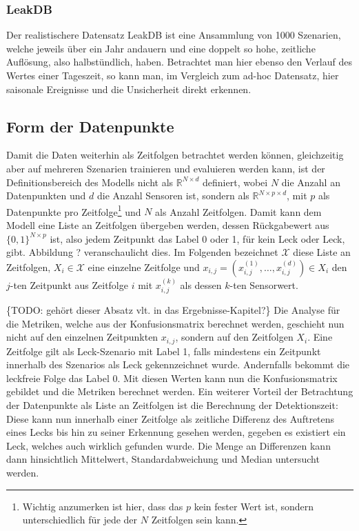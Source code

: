 \subsubsection*{LeakDB}

Der realistischere Datensatz LeakDB ist eine Ansammlung von 1000 Szenarien, welche jeweils über ein Jahr andauern
 und eine doppelt so hohe, zeitliche Auflösung, also halbstündlich, haben. Betrachtet man hier ebenso den Verlauf
 des Wertes einer Tageszeit, so kann man, im Vergleich zum ad-hoc Datensatz, hier saisonale Ereignisse und die
 Unsicherheit direkt erkennen.

\subsection*{Form der Datenpunkte}

Damit die Daten weiterhin als Zeitfolgen betrachtet werden können, gleichzeitig aber auf mehreren Szenarien
 trainieren und evaluieren werden kann, ist der Definitionsbereich des Modells nicht als $\mathbb{R}^{N \times d}$
 definiert, wobei $N$ die Anzahl an Datenpunkten und $d$ die Anzahl Sensoren ist, sondern als
 $\mathbb{R}^{N \times p \times d}$, mit $p$ als Datenpunkte pro Zeitfolge\footnote{Wichtig anzumerken ist hier,
 dass das $p$ kein fester Wert ist, sondern unterschiedlich für jede der $N$ Zeitfolgen sein kann.} und $N$
 als Anzahl Zeitfolgen. Damit kann dem Modell eine Liste an Zeitfolgen übergeben werden,
 dessen Rückgabewert aus $\{0, 1\}^{N \times p}$ ist, also jedem Zeitpunkt das Label 0 oder 1, für kein Leck
 oder Leck, gibt. Abbildung ? veranschaulicht dies. Im Folgenden bezeichnet $\mathcal{X}$ diese Liste an Zeitfolgen,
 $X_i \in \mathcal{X}$ eine einzelne Zeitfolge und $x_{i, j} = (x_{i, j}^{(1)}, \dots, x_{i, j}^{(d)}) \in X_i$ den $j$-ten
 Zeitpunkt aus Zeitfolge $i$ mit $x_{i, j}^{(k)}$ als dessen $k$-ten Sensorwert.

\{TODO: gehört dieser Absatz vlt. in das Ergebnisse-Kapitel?\} Die Analyse für die Metriken, welche aus der
 Konfusionsmatrix berechnet werden, geschieht nun nicht auf den einzelnen Zeitpunkten $x_{i, j}$, sondern auf
 den Zeitfolgen $X_i$. Eine Zeitfolge gilt als Leck-Szenario mit Label 1, falls mindestens ein Zeitpunkt
 innerhalb des Szenarios als Leck gekennzeichnet wurde. Andernfalls bekommt die leckfreie Folge das Label 0.
 Mit diesen Werten kann nun die Konfusionsmatrix gebildet und die Metriken berechnet werden. Ein weiterer Vorteil
 der Betrachtung der Datenpunkte als Liste an Zeitfolgen ist die Berechnung der Detektionszeit: Diese kann nun
 innerhalb einer Zeitfolge als zeitliche Differenz des Auftretens eines Lecks bis hin zu seiner Erkennung gesehen
 werden, gegeben es existiert ein Leck, welches auch wirklich gefunden wurde. Die Menge an Differenzen kann dann
 hinsichtlich Mittelwert, Standardabweichung und Median untersucht werden.

